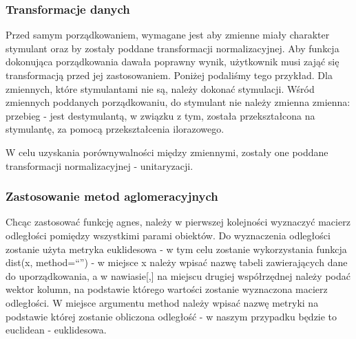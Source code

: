 \documentclass[12pt,a4paper]{report}
\begin{document}
{\subsubsection{Transformacje danych}\label{transformacje-danych}

Przed samym porządkowaniem, wymagane jest aby zmienne miały charakter
stymulant oraz by zostały poddane transformacji normalizacyjnej. Aby
funkcja dokonująca porządkowania dawała poprawny wynik, użytkownik musi
zająć się transformacją przed jej zastosowaniem. Poniżej podaliśmy tego
przykład. Dla zmiennych, które stymulantami nie są, należy dokonać
stymulacji. Wśród zmiennych poddanych porządkowaniu, do stymulant
nie należy zmienna zmienna: przebieg - jest destymulantą, w związku z
tym, została przekształcona na stymulantę, za pomocą przekształcenia
ilorazowego.


\begin{Shaded}
\begin{Highlighting}[]
\NormalTok{)}
\end{Highlighting}
\end{Shaded}

W celu uzyskania porównywalności między zmiennymi, zostały one poddane
transformacji normalizacyjnej - unitaryzacji.

\begin{Shaded}
\begin{Highlighting}[]
\end{Highlighting}
\end{Shaded}

\subsubsection{Zastosowanie metod aglomeracyjnych}


Chcąc zastosować funkcję agnes, należy w pierwszej kolejności wyznaczyć
macierz odległości pomiędzy wszystkimi parami obiektów. Do wyznaczenia
odległości zostanie użyta metryka euklidesowa - w tym celu zostanie
wykorzystania funkcja dist(x, method=``'') - w miejsce x należy wpisać
nazwę tabeli zawierających dane do uporządkowania, a w nawiasie{[},{]}
na miejscu drugiej współrzędnej należy podać wektor kolumn, na podstawie
którego wartości zostanie wyznaczona macierz odległości. W miejsce
argumentu method należy wpisać nazwę metryki na podstawie której zostanie
obliczona odległość - w naszym przypadku będzie to euclidean -
euklidesowa.

}
\end{document}

